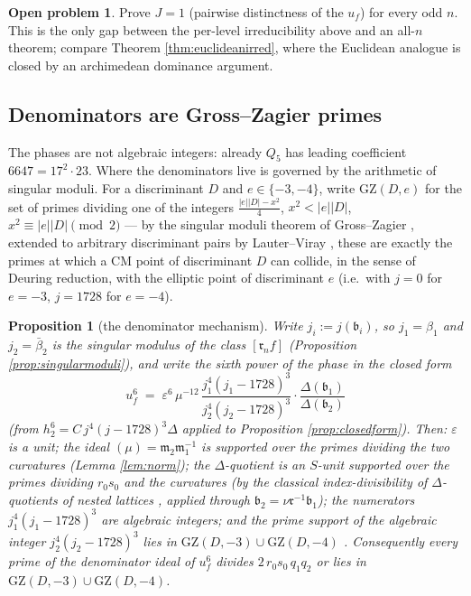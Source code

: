\documentclass[11pt]{amsart}
\numberwithin{equation}{section}
\theoremstyle{plain}
\newtheorem{proposition}[theorem]{Proposition}
\theoremstyle{definition}
\newtheorem{openproblem}[theorem]{Open problem}
\theoremstyle{remark}
\newcommand{\idealb}{\mathfrak{b}}
\newcommand{\idealm}{\mathfrak{m}}
\newcommand{\idealr}{\mathfrak{r}}
\newcommand{\GZ}{\mathrm{GZ}}
\begin{document}
\begin{openproblem}\label{op:distinct}
Prove $J = 1$ (pairwise distinctness of the $u_f$) for every odd $n$.
This is the only gap between the per-level irreducibility above and an
all-$n$ theorem; compare Theorem \ref{thm:euclideanirred}, where the
Euclidean analogue is closed by an archimedean dominance argument.
\end{openproblem}

\subsection{Denominators are Gross--Zagier primes}\label{subsec:gz}

The phases are not algebraic integers: already $Q_5$ has leading
coefficient $6647 = 17^2\cdot 23$.  Where the denominators live is
governed by the arithmetic of singular moduli.  For a discriminant $D$
and $e \in \{-3, -4\}$, write $\GZ(D, e)$ for the set of primes
dividing one of the integers $\tfrac{|e||D| - x^2}{4}$, $x^2 <
|e||D|$, $x^2 \equiv |e||D| \pmod 2$ --- by the singular moduli
theorem of Gross--Zagier \cite{GrossZagier1985}, extended to arbitrary
discriminant pairs by Lauter--Viray \cite{LauterViray2015}, these are
exactly the primes at which a CM point of discriminant $D$ can collide,
in the sense of Deuring reduction, with the elliptic point of
discriminant $e$ (i.e.\ with $j = 0$ for $e = -3$, $j = 1728$ for
$e = -4$).

\begin{proposition}[the denominator mechanism]\label{prop:gzmech}
Write $j_i := j(\idealb_i)$, so $j_1 = \beta_1$ and $j_2 =
\bar\beta_2$ is the singular modulus of the class $[\idealr_nf]$
(Proposition \ref{prop:singularmoduli}), and write the sixth power of
the phase in the closed form
\[
  u_f^6 \;=\; \varepsilon^6\,\mu^{-12}\,
  \frac{j_1^4(j_1 - 1728)^3}{j_2^4(j_2 - 1728)^3}
  \cdot\frac{\Delta(\idealb_1)}{\Delta(\idealb_2)}
\]
(from $h_2^6 = C\,j^4(j - 1728)^3\Delta$ applied to Proposition
\ref{prop:closedform}).  Then: $\varepsilon$ is a unit; the ideal
$(\mu) = \idealm_2\idealm_1^{-1}$ is supported over the primes
dividing the two curvatures (Lemma \ref{lem:norm}); the
$\Delta$-quotient is an $S$-unit supported over the primes dividing
$r_0s_0$ and the curvatures (by the classical index-divisibility of
$\Delta$-quotients of nested lattices \cite[Ch.~12]{Lang1987}, applied
through $\idealb_2 = \nu\idealr^{-1}\idealb_1$); the numerators
$j_1^4(j_1 - 1728)^3$ are algebraic integers; and the prime
support of the algebraic integer $j_2^4(j_2 - 1728)^3$ lies in
$\GZ(D, -3) \cup \GZ(D, -4)$ \cite{GrossZagier1985, LauterViray2015}.
Consequently every prime of the denominator ideal of $u_f^6$ divides
$2\,r_0s_0\,q_1q_2$ or lies in $\GZ(D, -3) \cup \GZ(D, -4)$.
\end{proposition}
\end{document}
